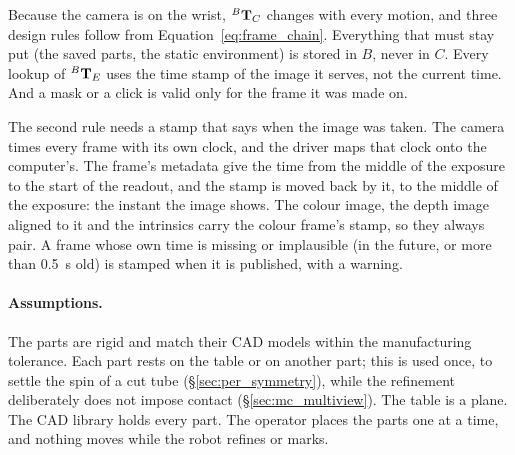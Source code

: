 Because the camera is on the wrist, ${}^{B}\mathbf{T}_{C}$ changes with every motion, and three design
rules follow from Equation~\ref{eq:frame_chain}. Everything that must stay put (the saved parts,
the static environment) is stored in $B$, never in $C$. Every lookup of ${}^{B}\mathbf{T}_{E}$ uses the
time stamp of the image it serves, not the current time. And a mask or a click is valid only for
the frame it was made on.

The second rule needs a stamp that says when the image was taken. The camera times every frame with
its own clock, and the driver maps that clock onto the computer's. The frame's metadata give the
time from the middle of the exposure to the start of the readout, and the stamp is moved back by it,
to the middle of the exposure: the instant the image shows. The colour image, the depth image
aligned to it and the intrinsics carry the colour frame's stamp, so they always pair. A frame whose
own time is missing or implausible (in the future, or more than 0.5~s old) is stamped when it is
published, with a warning.

\paragraph{Assumptions.} The parts are rigid and match their CAD models within the
manufacturing tolerance. Each part rests on the table or on another part; this is used once,
to settle the spin of a cut tube (\S\ref{sec:per_symmetry}), while the refinement deliberately
does not impose contact (\S\ref{sec:mc_multiview}). The table is a plane. The CAD library holds
every part. The operator places the parts one at a time, and nothing moves while the robot
refines or marks.

